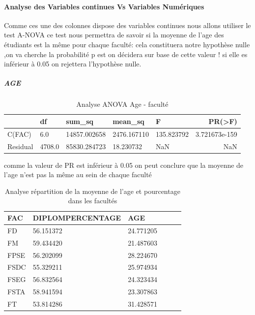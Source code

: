  \paragraph{Analyse des Variables continues Vs Variables Numériques}
 Comme ces une des colonnes dispose des variables continues nous allons
 utiliser le test A-NOVA
 ce test nous permettra de savoir si la moyenne de l'age des étudiants
 est la même pour chaque faculté: cela constituera notre hypothèse nulle
 ,on va cherche la probabilité p est on décidera sur base de cette valeur
 ! si elle es inférieur à 0.05 on rejettera l'hypothèse nulle.
\subparagraph{AGE}
 \begin{table}[!htbp]
 	\centering
 	\begingroup %
 	\captionsetup{type=table} %
 	\caption{Analyse ANOVA Age - faculté}
 	\label{tab:ANOVAAge}
 	\begin{tabular}{lllllr}
 		\toprule
 		{} & df     &   sum\_sq &     mean\_sq      &     F    &     PR(>F) \\
 		\midrule
 		C(FAC)    &   6.0 &  14857.002658 & 2476.167110 & 135.823792  &3.721673e-159 \\
 		Residual & 4708.0  &85830.284723    &18.230732    &     NaN    &        NaN \\
 		\bottomrule
 	\end{tabular}
 	\endgroup
 \end{table}
 comme la valeur de PR est inférieur à 0.05 on peut conclure que la
 moyenne de l'age n'est pas la même au sein de chaque faculté
\begin{table}[!htbp]
	\centering
	\begingroup %
	\captionsetup{type=table} %
	\caption{Analyse répartition de la moyenne de l'age et pourcentage dans les facultés}
	\label{tab:ANOVAge}
	\begin{tabular}{lllllr}
		\toprule
		FAC & DIPLOMPERCENTAGE &       AGE \\
		\midrule
		FD          &      56.151372  &24.771205 \\
		FM            &   59.434420 & 21.487603\\
		FPSE         &     56.202099  &28.224670\\
		FSDC      &        55.329211 & 25.974934\\
		FSEG        &   56.832564 & 24.323434\\
		FSTA       &      58.941594 & 23.307863\\
		FT       &         53.814286 & 31.428571\\
		\bottomrule
	\end{tabular}
	\endgroup
\end{table}
